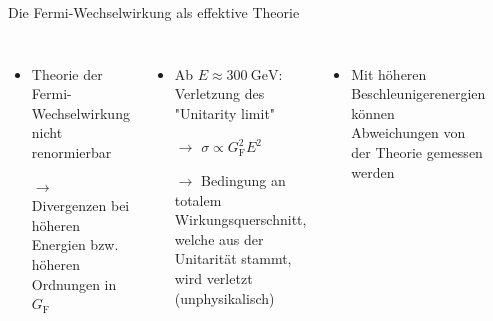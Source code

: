 \documentclass[aspectratio=1610, professionalfonts, 10pt]{beamer}
\begin{document}
\begin{frame}{Die Fermi-Wechselwirkung als effektive Theorie}
	\begin{columns}
			\begin{itemize}
				\setlength\itemsep{0.5em}
				\item Theorie der Fermi-Wechselwirkung nicht renormierbar
				\item [$\rightarrow$] Divergenzen bei höheren Energien bzw. höheren Ordnungen in $G_\text{F}$
			\end{itemize}
				\vspace*{10px}
			\begin{itemize}
				\item Ab $E \approx \SI{300}{\giga\electronvolt}$: Verletzung des "Unitarity limit"
				\item [$\rightarrow$] $\sigma \propto G_\text{F}^2 E^2$
				\item [$\rightarrow$] Bedingung an totalem Wirkungsquerschnitt, welche aus der Unitarität stammt, wird verletzt (unphysikalisch) \cite{perkins_2000}
			\end{itemize}
			\vspace*{10px}
			\begin{itemize}
				\item Mit höheren Beschleunigerenergien können Abweichungen von der Theorie gemessen werden
			\end{itemize}
			\begin{figure}
	  			\centering
				\includegraphics[width=\linewidth]{Images/Enrico_Fermi_1943-49.jpg}

\end{figure}
\end{columns}
\end{frame}
\end{document}
